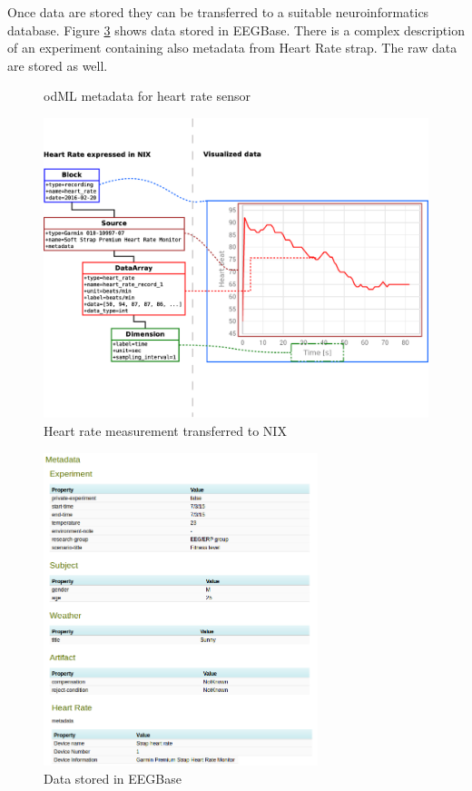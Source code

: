 \documentclass[conference]{IEEEconf}
\begin{document}
Once data are stored they can be transferred to a suitable neuroinformatics database. Figure \ref{fig:EEGBase} shows data stored in EEGBase. There is a complex description of an experiment containing also metadata from Heart Rate strap. The raw data are stored as well.

\begin{figure}

\caption{\label{odML}odML metadata for heart rate sensor}
\end{figure}

\begin{figure}
\centering\includegraphics[width=13cm]{NIX-example}
\caption{\label{NIX-ex}Heart rate measurement transferred to NIX}
\end{figure}

\begin{figure}
  \centering\includegraphics[width=8cm]{portal_example.png}
  \caption{Data stored in EEGBase}
  \label{fig:EEGBase}
 \end{figure}
\end{document}
